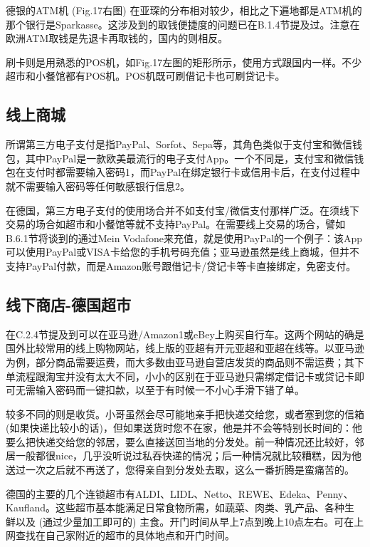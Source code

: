     德银的ATM机 (Fig.17右图) 在亚琛的分布相对较少，相比之下遍地都是ATM机的那个银行是Sparkasse。这涉及到的取钱便捷度的问题已在B.1.4节提及过。注意在欧洲ATM取钱是先退卡再取钱的，国内的则相反。

    刷卡则是用熟悉的POS机，如Fig.17左图的矩形所示，使用方式跟国内一样。不少超市和小餐馆都有POS机。POS机既可刷借记卡也可刷贷记卡。

  \subsection{线上商城}\label{subsec:线上商城}

    所谓第三方电子支付是指PayPal、Sorfot、Sepa等，其角色类似于支付宝和微信钱包，其中PayPal是一款欧美最流行的电子支付App。一个不同是，支付宝和微信钱包在支付时都需要输入密码1，而PayPal在绑定银行卡或信用卡后，在支付过程中就不需要输入密码等任何敏感银行信息2。

    在德国，第三方电子支付的使用场合并不如支付宝/微信支付那样广泛。在须线下交易的场合如超市和小餐馆等就不支持PayPal。在需要线上交易的场合，譬如B.6.1节将谈到的通过Mein Vodafone来充值，就是使用PayPal的一个例子：该App可以使用PayPal或VISA卡给您的手机号码充值；亚马逊虽然是线上商城，但并不支持PayPal付款，而是Amazon账号跟借记卡/贷记卡等卡直接绑定，免密支付。

  \subsection{线下商店-德国超市}\label{subsec:线下商店-德国超市}

    在C.2.4节提及到可以在亚马逊/Amazon1或eBey上购买自行车。这两个网站的确是国外比较常用的线上购物网站，线上版的亚超有开元亚超和亚超在线等。以亚马逊为例，部分商品需要运费，而大多数由亚马逊自营店发货的商品则不需运费；其下单流程跟淘宝并没有太大不同，小小的区别在于亚马逊只需绑定借记卡或贷记卡即可无需输入密码而一键扣款，以至于有时候一不小心手滑下错了单。

    较多不同的则是收货。小哥虽然会尽可能地亲手把快递交给您，或者塞到您的信箱 (如果快递比较小的话)，但如果送货时您不在家，他是并不会等特别长时间的：他要么把快递交给您的邻居，要么直接送回当地的分发处。前一种情况还比较好，邻居一般都很nice，几乎没听说过私吞快递的情况；后一种情况就比较糟糕，因为他送过一次之后就不再送了，您得亲自到分发处去取，这么一番折腾是蛮痛苦的。

    德国的主要的几个连锁超市有ALDI、LIDL、Netto、REWE、Edeka、Penny、Kaufland。这些超市基本能满足日常食物所需，如蔬菜、肉类、乳产品、各种生鲜以及 (通过少量加工即可的) 主食。开门时间从早上7点到晚上10点左右。可在上网查找在自己家附近的超市的具体地点和开门时间。

